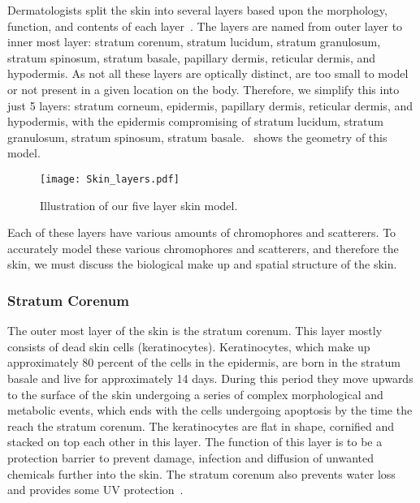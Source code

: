 Dermatologists split the skin into several layers based upon the morphology, function, and contents of each layer~\cite{freedberg1999fitzpatrick,zaidi2010dermatology}.
The layers are named from outer layer to inner most layer: stratum corenum, stratum lucidum, stratum granulosum, stratum spinosum, stratum basale, papillary dermis, reticular dermis, and hypodermis.
As not all these layers are optically distinct, are too small to model or not present in a given location on the body.
Therefore, we simplify this into just 5 layers: stratum corneum, epidermis, papillary dermis, reticular dermis, and hypodermis, with the epidermis compromising of stratum lucidum, stratum granulosum, stratum spinosum, stratum basale.~ shows the geometry of this model.

\begin{figure}[!htpb]
    \centering
    \texttt{[image: Skin\_layers.pdf]}
    \caption{Illustration of our five layer skin model.}
    \label{fig:skinexample}
\end{figure}

Each of these layers have various amounts of chromophores and scatterers.
To accurately model these various chromophores and scatterers, and therefore the skin, we must discuss the biological make up and spatial structure of the skin.

\subsubsection*{Stratum Corenum} %
\label{sub:stratum}

The outer most layer of the skin is the stratum corenum.
This layer mostly consists of dead skin cells (keratinocytes).
Keratinocytes, which make up approximately 80 percent of the cells in the epidermis, are born in the stratum basale and live for approximately 14 days.
During this period they move upwards to the surface of the skin undergoing a series of complex morphological and metabolic events, which ends with the cells undergoing apoptosis by the time the reach the stratum corenum.
The keratinocytes are flat in shape, cornified and stacked on top each other in this layer.
The function of this layer is to be a protection barrier to prevent damage, infection and diffusion of unwanted chemicals further into the skin.
The stratum corenum also prevents water loss and provides some UV protection~\cite{freedberg1999fitzpatrick,zaidi2010dermatology}.


